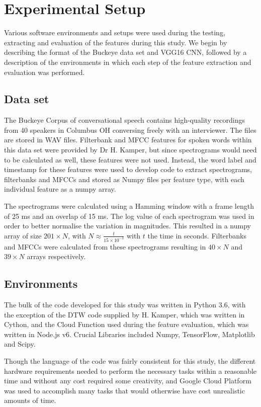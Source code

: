 \chapter{Experimental Setup}

Various software environments and setups were used during the testing, extracting and evaluation of the features during this study.
We begin by describing the format of the Buckeye data set and VGG16 CNN, followed by a description of the environments in which each step of the feature extraction and evaluation was performed.

\section{Data set}

The Buckeye Corpus of conversational speech contains high-quality recordings from 40 speakers in Columbus OH conversing freely with an interviewer. 
The files are stored in WAV files.
Filterbank and MFCC features for spoken words within this data set were provided by Dr H. Kamper, but since spectrograms would need to be calculated as well, these features were not used. 
Instead, the word label and timestamp for these features were used to develop code to extract spectrograms, filterbanks and MFCCs and stored as Numpy files per feature type, with each individual feature as a numpy array.

The spectrograms were calculated using a Hamming window with a frame length of 25 ms and an overlap of 15 ms.
The log value of each spectrogram was used in order to better normalise the variation in magnitudes.
This resulted in a numpy array of size $201 \times N$, with $N \approx \frac{t}{15\times10^{-3}}$ with $t$ the time in seconds.
Filterbanks and MFCCs were calculated from these spectrograms resulting in $40 \times N$ and $39 \times N$ arrays respectively.

\section{Environments}

The bulk of the code developed for this study was written in Python 3.6, with the exception of the DTW code supplied by H.
Kamper, which was written in Cython, and the Cloud Function used during the feature evaluation, which was written in Node.js v6.
Crucial Libraries included Numpy, TensorFlow, Matplotlib and Scipy.

Though the language of the code was fairly consistent for this study, the different hardware requirements needed to perform the necessary tasks within a reasonable time and without any cost required some creativity, and Google Cloud Platform was used to accomplish many tasks that would otherwise have cost unrealistic amounts of time.

